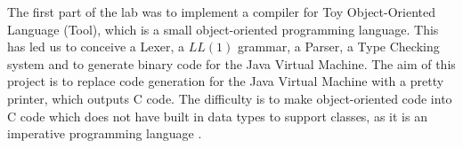 The first part of the lab was to implement a compiler for Toy Object-Oriented Language (Tool),
which is a small object-oriented programming language.
\newline
This has led us to conceive a Lexer, a \(LL(1)\) grammar, a Parser, a Type Checking system and
to generate binary code for the Java Virtual Machine.
\newline
The aim of this project is to replace code generation for the Java Virtual Machine
with a pretty printer, which outputs C code.
\newline
The difficulty is to make object-oriented code into C code which does not have built in data types to support classes, 
as it is an imperative programming language .
